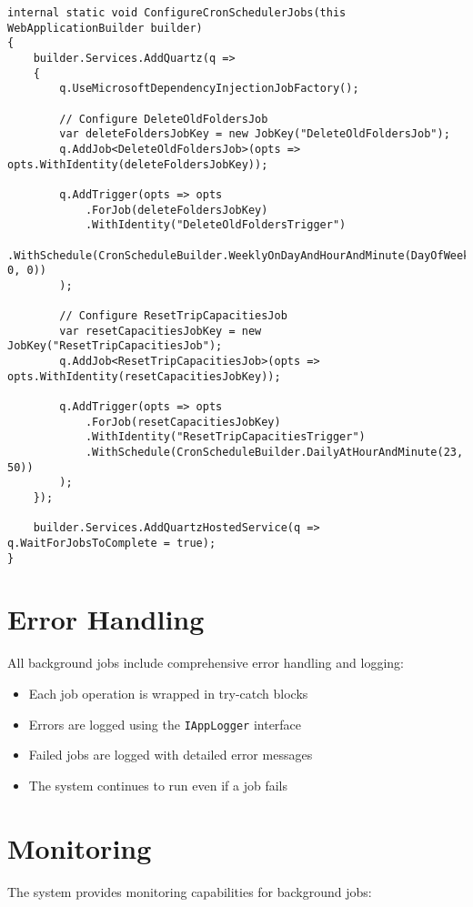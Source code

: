 \begin{lstlisting}[language=CSharp]
internal static void ConfigureCronSchedulerJobs(this WebApplicationBuilder builder)
{
    builder.Services.AddQuartz(q =>
    {
        q.UseMicrosoftDependencyInjectionJobFactory();

        // Configure DeleteOldFoldersJob
        var deleteFoldersJobKey = new JobKey("DeleteOldFoldersJob");
        q.AddJob<DeleteOldFoldersJob>(opts => opts.WithIdentity(deleteFoldersJobKey));

        q.AddTrigger(opts => opts
            .ForJob(deleteFoldersJobKey)
            .WithIdentity("DeleteOldFoldersTrigger")
            .WithSchedule(CronScheduleBuilder.WeeklyOnDayAndHourAndMinute(DayOfWeek.Monday, 0, 0))
        );

        // Configure ResetTripCapacitiesJob
        var resetCapacitiesJobKey = new JobKey("ResetTripCapacitiesJob");
        q.AddJob<ResetTripCapacitiesJob>(opts => opts.WithIdentity(resetCapacitiesJobKey));

        q.AddTrigger(opts => opts
            .ForJob(resetCapacitiesJobKey)
            .WithIdentity("ResetTripCapacitiesTrigger")
            .WithSchedule(CronScheduleBuilder.DailyAtHourAndMinute(23, 50))
        );
    });

    builder.Services.AddQuartzHostedService(q => q.WaitForJobsToComplete = true);
}
\end{lstlisting}

\section{Error Handling}
All background jobs include comprehensive error handling and logging:

\begin{itemize}
    \item Each job operation is wrapped in try-catch blocks
    \item Errors are logged using the \texttt{IAppLogger} interface
    \item Failed jobs are logged with detailed error messages
    \item The system continues to run even if a job fails
\end{itemize}

\section{Monitoring}
The system provides monitoring capabilities for background jobs:

